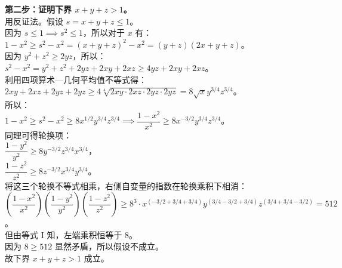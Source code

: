 {  \textbf{第二步：证明下界 \(x + y + z > 1\)。}\\
  用反证法。假设 \(s = x + y + z \leqslant 1\)。\\
  因为 \(s \leqslant 1 \implies s^2 \leqslant 1\)，所以对于 \(x\) 有：\\
  \(1 - x^2 \geqslant s^2 - x^2 = (x + y + z)^2 - x^2 = (y + z)(2x + y + z)\)。\\
  因为 \(y^2 + z^2 \geqslant 2yz\)，所以：\\
  \(s^2 - x^2 = y^2 + z^2 + 2yz + 2xy + 2xz \geqslant 4yz + 2xy + 2xz\)。\\
  利用四项算术—几何平均值不等式得：\\
  \(2xy + 2xz + 2yz + 2yz \geqslant 4\sqrt[4]{2xy \cdot 2xz \cdot 2yz \cdot 2yz} = 8\sqrt{x}y^{3/4}z^{3/4}\)。\\
  所以：\\
  \(1 - x^2 \geqslant s^2 - x^2 \geqslant 8x^{1/2}y^{3/4}z^{3/4} \implies \dfrac{1 - x^2}{x^2} \geqslant 8x^{-3/2}y^{3/4}z^{3/4}\)。\\
  同理可得轮换项：\\
  \(\dfrac{1 - y^2}{y^2} \geqslant 8y^{-3/2}z^{3/4}x^{3/4}\)，\\
  \(\dfrac{1 - z^2}{z^2} \geqslant 8z^{-3/2}x^{3/4}y^{3/4}\)。\\
  将这三个轮换不等式相乘，右侧自变量的指数在轮换乘积下相消：\\
  \(\left(\dfrac{1 - x^2}{x^2}\right)\left(\dfrac{1 - y^2}{y^2}\right)\left(\dfrac{1 - z^2}{z^2}\right) \geqslant 8^3 \cdot x^{(-3/2+3/4+3/4)} y^{(3/4-3/2+3/4)} z^{(3/4+3/4-3/2)} = 512\)。\\
  但由等式 I 知，左端乘积恒等于 8。\\
  因为 \(8 \geqslant 512\) 显然矛盾，所以假设不成立。\\
  故下界 \(x + y + z > 1\) 成立。\\
  
}
